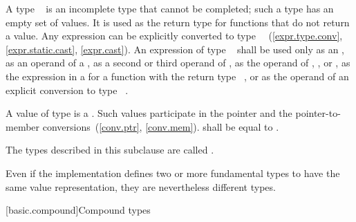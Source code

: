 \pnum
{}%
A type \cv{}~
is an incomplete type that cannot be completed; such a type has
an empty set of values. It is used as the return
type for functions that do not return a value. Any expression can be
explicitly converted to type \cv{}~~(\ref{expr.type.conv},
\ref{expr.static.cast}, \ref{expr.cast}).
An expression of type \cv{}~ shall
be used only as an , as an operand
of a , as a second or third operand
of , as the operand of
, , or , as
the expression in a  for a function
with the return type \cv{}~, or as the operand of an explicit conversion
to type \cv{}~.

\pnum
A value of type  is a . Such values participate in the pointer and the
pointer-to-member conversions~(\ref{conv.ptr}, \ref{conv.mem}).
 shall be equal to .

\pnum
{}%
The types described in this subclause
are called .
\begin{note}
Even if the implementation defines two or more fundamental types to have the
same value representation, they are nevertheless different types.
\end{note}

[basic.compound]{Compound types}

